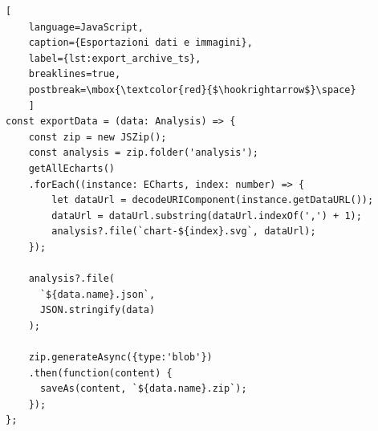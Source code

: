 \begin{lstfloat}
    \begin{lstlisting}[
    language=JavaScript,
    caption={Esportazioni dati e immagini},
    label={lst:export_archive_ts},
    breaklines=true,
    postbreak=\mbox{\textcolor{red}{$\hookrightarrow$}\space}
    ]
const exportData = (data: Analysis) => {
    const zip = new JSZip();
    const analysis = zip.folder('analysis');
    getAllEcharts()
    .forEach((instance: ECharts, index: number) => {
        let dataUrl = decodeURIComponent(instance.getDataURL());
        dataUrl = dataUrl.substring(dataUrl.indexOf(',') + 1);
        analysis?.file(`chart-${index}.svg`, dataUrl);
    });
    
    analysis?.file(
      `${data.name}.json`, 
      JSON.stringify(data)
    );
    
    zip.generateAsync({type:'blob'})
    .then(function(content) {
      saveAs(content, `${data.name}.zip`);
    });
};
    \end{lstlisting}
\end{lstfloat}


